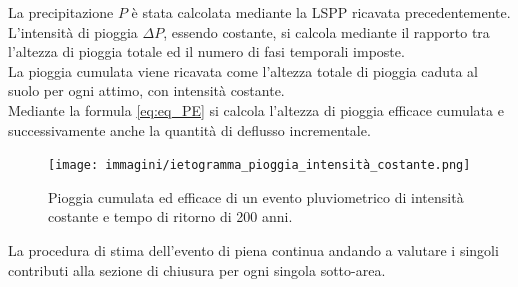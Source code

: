 La precipitazione $P$ è stata calcolata mediante la LSPP ricavata precedentemente.\\
L'intensità di pioggia $\Delta P$, essendo costante, si calcola mediante il rapporto tra l'altezza di pioggia totale ed il numero di fasi temporali imposte.\\
La pioggia cumulata viene ricavata come l'altezza totale di pioggia caduta al suolo per ogni attimo, con intensità costante.\\
Mediante la formula \ref{eq:eq_PE} si calcola l'altezza di pioggia efficace cumulata e successivamente anche la quantità di deflusso incrementale. 
\begin{figure}[H]  \centering
    \texttt{[image: immagini/ietogramma\_pioggia\_intensità\_costante.png]}
    \caption{Pioggia cumulata ed efficace di un evento pluviometrico di intensità costante e tempo di ritorno di 200 anni.}
    \label{ietogramma_pioggia_intensità_costante}
\end{figure}

La procedura di stima dell'evento di piena continua andando a valutare i singoli contributi alla sezione di chiusura per ogni singola sotto-area.

